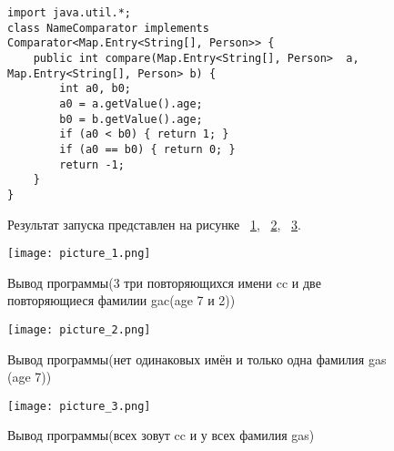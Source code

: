 \documentclass[a4paper, 14pt]{extarticle}
\begin{document}
\begin{figure}[!htb]
\begin{lstlisting}[language={},caption={класс NameComparator},label={lst:code5}]
import java.util.*;
class NameComparator implements Comparator<Map.Entry<String[], Person>> {
    public int compare(Map.Entry<String[], Person>  a, Map.Entry<String[], Person> b) {
        int a0, b0;
        a0 = a.getValue().age;
        b0 = b.getValue().age;
        if (a0 < b0) { return 1; }
        if (a0 == b0) { return 0; }
        return -1;
    }
}
\end{lstlisting}
\end{figure}

\begin{figure}[!htb]
Результат запуска представлен на рисунке ~\ref{fig:picture_1.png}, ~\ref{fig:picture_2.png}, ~\ref{fig:picture_3.png}.
\end{figure}

\begin{figure}[!htb]
	\centering
	\texttt{[image: picture\_1.png]}
\caption{Вывод программы(3 три повторяющихся имени cc и две повторяющиеся фамилии gac(age 7 и 2))}
\label{fig:picture_1.png}
\end{figure}

\begin{figure}[!htb]
	\centering
	\texttt{[image: picture\_2.png]}
\caption{Вывод программы(нет одинаковых имён и только одна фамилия gas (age 7))}
\label{fig:picture_2.png}
\end{figure}

\begin{figure}[!htb]
	\centering
	\texttt{[image: picture\_3.png]}
\caption{Вывод программы(всех зовут cc и у всех фамилия gas)}
\label{fig:picture_3.png}
\end{figure}
\end{document}
